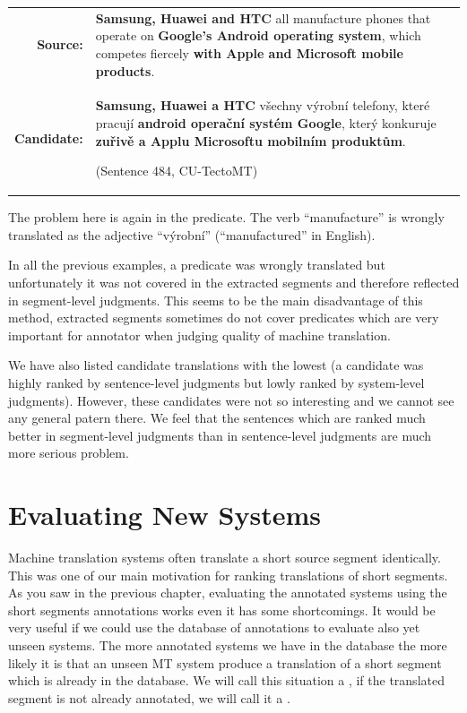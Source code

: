 \begin{center}
  \begin{tabular}{rp{11cm}}

    \textbf{Source:} & \textbf{Samsung, Huawei and HTC} all manufacture phones
    that operate on \textbf{Google's Android operating system}, which competes
    fiercely \textbf{with Apple and Microsoft mobile products}. \\

    \textbf{Candidate:} & \textbf{Samsung, Huawei a HTC} všechny výrobní
    telefony, které pracují \textbf{android operační systém Google}, který
    konkuruje \textbf{zuřivě a Applu Microsoftu mobilním produktům}.
    
    (Sentence 484, CU-TectoMT) \\

  \end{tabular}
\end{center}

The problem here is again in the predicate. The verb ``manufacture'' is wrongly
translated as the adjective ``výrobní'' (``manufactured'' in English).

In all the previous examples, a predicate was wrongly translated but
unfortunately it was not covered in the extracted segments and therefore
reflected in segment-level judgments. This seems to be the main disadvantage of
this method, extracted segments sometimes do not cover predicates which are
very important for annotator when judging quality of machine translation.

We have also listed candidate translations with the lowest  (a candidate was highly ranked by sentence-level judgments but lowly
ranked by system-level judgments). However, these candidates were not so
interesting and we cannot see any general patern there. We feel that the
sentences which are ranked much better in segment-level judgments than in
sentence-level judgments are much more serious problem.

\section{Evaluating New Systems}
\label{evaluating-new-systems}

Machine translation systems often translate a short source segment identically.
This was one of our main motivation for ranking translations of short segments.
As you saw in the previous chapter, evaluating the annotated systems using the
short segments annotations works even it has some shortcomings.  It would be
very useful if we could use the database of annotations to evaluate also yet
unseen systems. The more annotated systems we have in the database the more
likely it is that an unseen MT system produce a translation of a short segment
which is already in the database. We will call this situation a ,
if the translated segment is not already annotated, we will call it a
.

